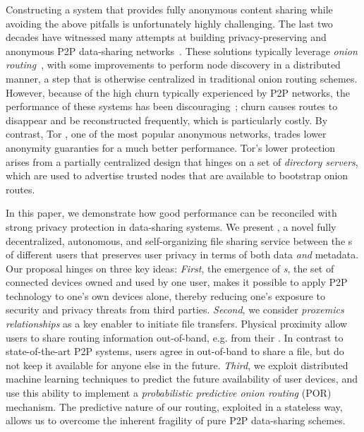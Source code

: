 Constructing a system that provides fully anonymous content sharing while avoiding the above pitfalls is unfortunately highly
challenging. The last two decades have witnessed many attempts at building privacy-preserving and anonymous P2P data-sharing
networks~\cite{Clarke:2001,Gnunet2002,Freedman:2002,Nambiar:2006,Rennhard:2002}.
These solutions typically leverage \emph{onion
 routing}~\cite{Chaum:1981}, with some improvements to perform node
 discovery in a distributed manner, a step that is otherwise
centralized in traditional onion routing schemes. However, because of the high
churn typically experienced by P2P networks, the performance of these systems has been
discouraging~\cite{LeBlond:2013}; churn causes routes to disappear and be
reconstructed frequently, which is particularly costly. By contrast, Tor
\cite{Dingledine:2004}, one of the most popular anonymous networks,
trades lower anonymity guaranties for a much better performance. Tor's lower protection arises from
a partially centralized design that hinges on a set of \emph{directory
servers}, which are used to advertise trusted nodes that are available to bootstrap onion
routes. 

In this paper, we demonstrate how good performance can be reconciled
with strong privacy protection in data-sharing systems. We present
\name{}, a novel fully decentralized, autonomous,
and self-organizing file sharing service between the \squad{}s of different users that preserves user privacy
in terms of both data \emph{and} metadata.  Our proposal hinges on three
key ideas: \emph{First}, the emergence of \emph{\squad{}s}, the set of connected devices owned and used by one user, 
makes it possible to apply P2P technology to one's own devices
alone, thereby reducing one's exposure to security and privacy threats
from third parties. \emph{Second}, we consider \emph{proxemics relationships} as a key enabler to initiate file
transfers. Physical proximity allow users to share
routing information out-of-band, e.g. from their
\squad.  In contrast to state-of-the-art P2P systems, users agree in \name out-of-band to share a file, but
do not keep it available for anyone else in the future. \emph{Third}, we
exploit distributed machine learning techniques to predict the future
availability of user devices, and use this ability to implement a
\emph{probabilistic predictive onion routing} (POR) mechanism. The
predictive nature of our routing, exploited in a stateless way, allows us to overcome the inherent fragility of pure P2P data-sharing schemes. 


